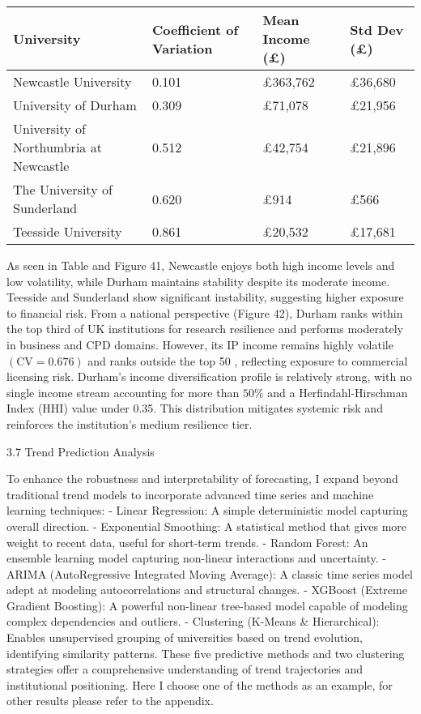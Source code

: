 \begin{tabular}{|l|l|l|l|}
\hline University & Coefficient of Variation & Mean Income (£) & Std Dev (£) \\
\hline Newcastle University & 0.101 & £363,762 & £36,680 \\
\hline University of Durham & 0.309 & £71,078 & £21,956 \\
\hline University of Northumbria at Newcastle & 0.512 & £42,754 & £21,896 \\
\hline The University of Sunderland & 0.620 & £914 & £566 \\
\hline Teesside University & 0.861 & £20,532 & £17,681 \\
\hline
\end{tabular}

As seen in Table and Figure 41, Newcastle enjoys both high income levels and low volatility, while Durham maintains stability despite its moderate income. Teesside and Sunderland show significant instability, suggesting higher exposure to financial risk.
From a national perspective (Figure 42), Durham ranks within the top third of UK institutions for research resilience and performs moderately in business and CPD domains. However, its IP income remains highly volatile $(\mathrm{CV}=0.676)$ and ranks outside the top 50 , reflecting exposure to commercial licensing risk.
Durham's income diversification profile is relatively strong, with no single income stream accounting for more than $50 \%$ and a Herfindahl-Hirschman Index (HHI) value under 0.35. This distribution mitigates systemic risk and reinforces the institution's medium resilience tier.

3.7 Trend Prediction Analysis

To enhance the robustness and interpretability of forecasting, I expand beyond traditional trend models to incorporate advanced time series and machine learning techniques:
- Linear Regression: A simple deterministic model capturing overall direction.
- Exponential Smoothing: A statistical method that gives more weight to recent data, useful for short-term trends.
- Random Forest: An ensemble learning model capturing non-linear interactions and uncertainty.
- ARIMA (AutoRegressive Integrated Moving Average): A classic time series model adept at modeling autocorrelations and structural changes.
- XGBoost (Extreme Gradient Boosting): A powerful non-linear tree-based model capable of modeling complex dependencies and outliers.
- Clustering (K-Means \& Hierarchical): Enables unsupervised grouping of universities based on trend evolution, identifying similarity patterns.
These five predictive methods and two clustering strategies offer a comprehensive understanding of trend trajectories and institutional positioning. Here I choose one of the methods as an example, for other results please refer to the appendix.


